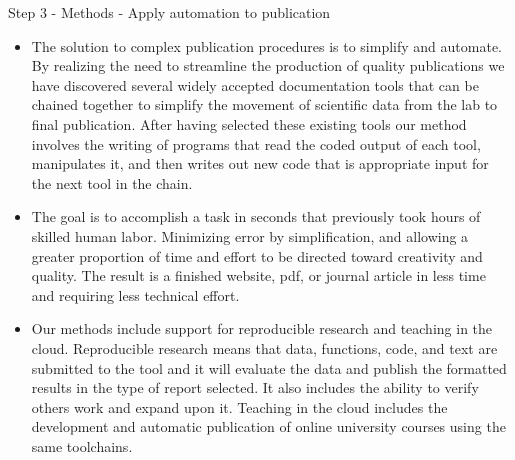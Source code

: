 \documentclass[final]{beamer}
\begin{document}
\begin{frame}[fragile]
\begin{columns}[t]
\begin{column}{0.31\linewidth}
\begin{minipage}[t][.955\textheight]{\linewidth}
\vfill%
\vspace{0ex}
\begin{block}{Step 3 - Methods - Apply automation to publication}
\vspace{0ex}
\begin{itemize}
\item The solution to complex publication procedures is to simplify and automate. By realizing the need to streamline the production of quality publications we have discovered several widely accepted documentation tools that can be chained together to simplify the movement of scientific data from the lab to final publication. After having selected these existing tools our method involves the writing of programs that read the coded output of each tool, manipulates it, and then writes out new code that is appropriate input for the next tool in the chain.
\item The goal is to accomplish a task in seconds that previously took hours of skilled human labor. Minimizing error by simplification, and allowing a greater proportion of time and effort to be directed toward creativity and quality.
The result is a finished website, pdf, or journal article in less time and requiring less technical effort.
\item Our methods include support for reproducible research and teaching in the cloud. Reproducible research means that data, functions, code, and text are submitted to the tool and it will evaluate the data and publish the formatted results in the type of report selected. It also includes the ability to verify others work and expand upon it. Teaching in the cloud includes the development and automatic publication of online university courses using the same toolchains.
\end{itemize}
\vspace{2ex}
\end{block}
\vfill


\end{minipage}
\end{column}
\end{columns}
\end{frame}
\end{document}
